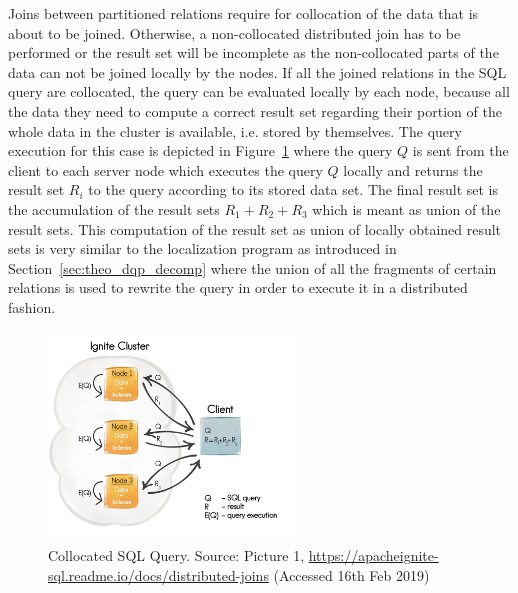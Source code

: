 Joins between partitioned relations require for collocation of the data that is about to be joined. Otherwise, a non-collocated distributed join has to be
performed or the result set will be incomplete as the non-collocated parts of the data can not be joined locally by the nodes. If all the joined relations
in the SQL query are collocated, the query can be evaluated locally by each node, because all the data they need to compute a correct result set regarding 
their portion of the whole data in the cluster is available, i.e. stored by themselves. The query execution for this case is depicted in
Figure~\ref{fig:ign_collocated} where the query $Q$ is sent from the client to each server node which executes the query $Q$ locally 
and returns the result set $R_i$ to the query according to its stored data set. The final result set is the accumulation of the result sets $R_1+R_2+R_3$
which is meant as union of the result sets. This computation of the result set as union of locally obtained result sets is very similar to the localization
program \cite[p.~199]{Ozsu1991} as introduced in Section~\ref{sec:theo_dqp_decomp} where the union of all the fragments of certain relations is used to
rewrite the query in order to execute it in a distributed fashion.  
\begin{figure}[ht]
    \centering
    \includegraphics[width=0.6\textwidth,keepaspectratio=true]{img/2af89cf-Collocated_sql_queries.png}
    \caption{Collocated SQL Query. Source: Picture 1, \protect\url{https://apacheignite-sql.readme.io/docs/distributed-joins} (Accessed 16th Feb 2019)}
    \label{fig:ign_collocated}
\end{figure}

